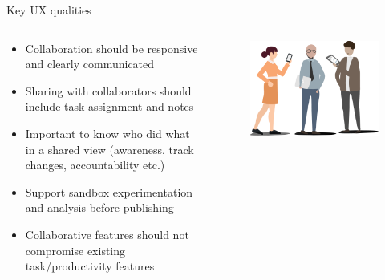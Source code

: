 \documentclass[aspectratio=169]{beamer}
\begin{document}
\begin{frame}{Key UX qualities}
    \begin{columns}
        \begin{column}{0.7\textwidth}
            \small
            \begin{itemize}
                \item Collaboration should be responsive and clearly communicated
                \item Sharing with collaborators should include task assignment and notes
                \item Important to know who did what in a shared view (awareness, track changes, accountability etc.)
                \item Support sandbox experimentation and analysis before publishing
                \item Collaborative features should not compromise existing task/productivity features
            \end{itemize}
        \end{column}
        \begin{column}{0.4\textwidth}
            \vspace{-2em}
            \begin{figure}[h]
                \centering
                \includegraphics[width=1\textwidth]{images/Users.png}
            \end{figure}
        \end{column}
    \end{columns}
\end{frame}
\end{document}
